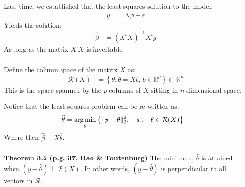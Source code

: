 \begin{frame}[fragile] \frametitle{}

Last time, we established that the least squares solution to the
model:
\begin{align*}
y &= X\beta + \epsilon
\end{align*}
Yields the solution:
\begin{align*}
\widehat{\beta} &= (X^t X)^{-1} X^t y
\end{align*}
As long as the matrix $X^t X$ is invertable.

\end{frame}

\begin{frame}[fragile] \frametitle{}

Define the column space of the matrix $X$ as:
\begin{align*}
\mathcal{R} (X) &= \left\{ \theta : \theta = X b, \, b \in \mathbb{R}^p \right\} \subset \mathbb{R}^n
\end{align*}
This is the space spanned by the $p$ columns of $X$ sitting in $n$-dimensional space.

\pause Notice that the least squares problem can be re-written as:
\begin{align*}
\widehat{\theta} &= \mathop{\mathrm{arg\,min}}_\theta \left\{ || y - \theta||_2^2, \quad \text{s.t} \quad \theta \in \mathcal{R} (X) \right\}
\end{align*}
Where then $\widehat{\beta} = X \widehat{\theta}$.

\end{frame}

\begin{frame}[fragile] \frametitle{}

{\bf Theorem 3.2 (p.g. 37, Rao \& Toutenburg)} The minimum, $\widehat{\theta}$ is
attained when $(y - \widehat{\theta}) \perp \mathcal{R}(X)$.
In other words, $(y - \widehat{\theta})$ is perpendicular to all vectors
in $\mathcal{R}$.

\end{frame}


